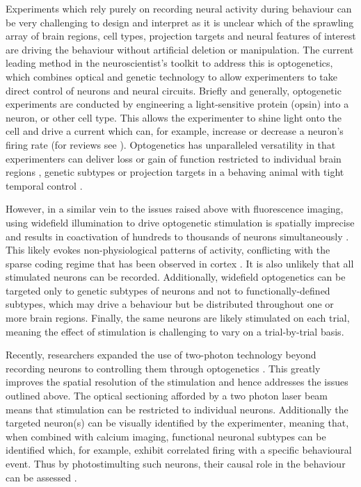Experiments which rely purely on recording neural activity during behaviour can be very challenging to design and interpret as it is unclear which of the sprawling array of brain regions, cell types, projection targets and neural features of interest are driving the behaviour without artificial deletion or manipulation. The current leading method in the neuroscientist’s toolkit to address this is optogenetics, which combines optical and genetic technology to allow experimenters to take direct control of neurons and neural circuits. Briefly and generally, optogenetic experiments are conducted by engineering a light-sensitive protein (opsin) into a neuron, or other cell type. This allows the experimenter to shine light onto the cell and drive a current which can, for example, increase or decrease a neuron's firing rate (for reviews see \cite{miesenbock_optogenetic_2009, deisseroth_optogenetics_2011}). Optogenetics has unparalleled versatility in that experimenters can deliver loss or gain of function restricted to individual brain regions \cite{zhang_optogenetic_2010}, genetic subtypes \cite{cardin_driving_2009, tye_dopamine_2013, zalocusky_nucleus_2016} or projection targets \cite{mattis_frequency-dependent_2014} in a behaving animal \cite{tye_amygdala_2011} with tight temporal control \cite{krook-magnuson_-demand_2013}. 

However, in a similar vein to the issues raised above with fluorescence imaging, using widefield illumination to drive optogenetic stimulation is spatially imprecise and results in coactivation of hundreds to thousands of neurons simultaneously \cite{huber_sparse_2008}. This likely evokes non-physiological patterns of activity, conflicting with the sparse coding regime that has been observed in cortex \cite{olshausen_sparse_2004}. It is also unlikely that all stimulated neurons can be recorded. Additionally, widefield optogenetics can be targeted only to genetic subtypes of neurons and not to functionally-defined subtypes, which may drive a behaviour but be distributed throughout one or more brain regions.  Finally, the same neurons are likely stimulated on each trial, meaning the effect of stimulation is challenging to vary on a trial-by-trial basis.

Recently, researchers expanded the use of two-photon technology beyond recording neurons to controlling them through optogenetics \cite{rickgauer_simultaneous_2014, packer_simultaneous_2015, hernandez_three-dimensional_2016, mardinly_precise_2018, chettih_single-neuron_2019, marshel_cortical_2019, daie_targeted_2021}. This greatly improves the spatial resolution of the stimulation and hence addresses the issues outlined above. The optical sectioning afforded by a two photon laser beam means that stimulation can be restricted to individual neurons. Additionally the targeted neuron(s) can be visually identified by the experimenter, meaning that, when combined with calcium imaging, functional neuronal subtypes can be identified which, for example, exhibit correlated firing with a specific behavioural event. Thus by photostimulting such neurons, their causal role in the behaviour can be assessed \cite{marshel_cortical_2019, daie_targeted_2021, dalgleish_how_2020, russell_influence_2019}.

